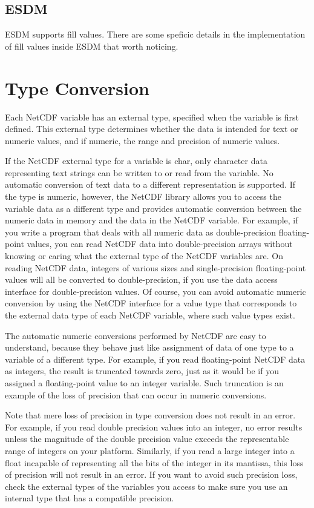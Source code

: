 \subsection{ESDM}


ESDM supports fill values. There are some speficic details in the implementation of fill values inside ESDM that worth noticing.

\tocheck

\section{Type Conversion}


Each NetCDF variable has an external type, specified when the variable is first defined. This external type determines whether the data is intended for text or numeric values, and if numeric, the range and precision of numeric values.

If the NetCDF external type for a variable is char, only character data representing text strings can be written to or read from the variable. No automatic conversion of text data to a different representation is supported. If the type is numeric, however, the NetCDF library allows you to access the variable data as a different type and provides automatic conversion between the numeric data in memory and the data in the NetCDF variable. For example, if you write a program that deals with all numeric data as double-precision floating-point values, you can read NetCDF data into double-precision arrays without knowing or caring what the external type of the NetCDF variables are. On reading NetCDF data, integers of various sizes and single-precision floating-point values will all be converted to double-precision, if you use the data access interface for double-precision values. Of course, you can avoid automatic numeric conversion by using the NetCDF interface for a value type that corresponds to the external data type of each NetCDF variable, where such value types exist.

The automatic numeric conversions performed by NetCDF are easy to understand, because they behave just like assignment of data of one type to a variable of a different type. For example, if you read floating-point NetCDF data as integers, the result is truncated towards zero, just as it would be if you assigned a floating-point value to an integer variable. Such truncation is an example of the loss of precision that can occur in numeric conversions.

Note that mere loss of precision in type conversion does not result in an error. For example, if you read double precision values into an integer, no error results unless the magnitude of the double precision value exceeds the representable range of integers on your platform. Similarly, if you read a large integer into a float incapable of representing all the bits of the integer in its mantissa, this loss of precision will not result in an error. If you want to avoid such precision loss, check the external types of the variables you access to make sure you use an internal type that has a compatible precision.

